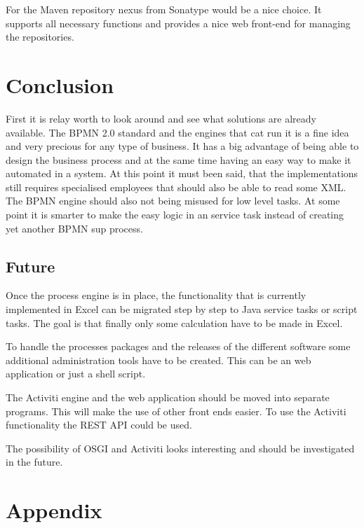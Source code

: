 \documentclass[paper=a4,twoside=false,BCOR=0mm,DIV=calc,fontsize=12pt]{scrartcl}
\begin{document}
For the Maven repository nexus from Sonatype would be a nice choice. It supports all necessary functions and provides a nice web front-end for managing the repositories.





\section{Conclusion}
First it is relay worth to look around and see what solutions are already available. The BPMN 2.0 standard and the engines that cat run it is a fine 
idea and very precious for any type of business. It has a big advantage of being able to design the business process and at the same time having an easy way to make it automated in a system.
At this point it must been said, that the implementations still requires specialised employees that should also be able to read some XML. The BPMN engine should also not being misused for low level tasks. At some point it is smarter to make the easy logic in an service task instead of creating yet another BPMN sup process.




\subsection{Future}
Once the process engine is in place, the functionality that is currently implemented in Excel can be migrated step by step to Java service tasks or script tasks. The goal is that finally only some calculation have to be made in Excel.

To handle the processes packages and the releases of the different software some additional administration tools have to be created. This can be an web application or just a shell script.

The Activiti engine and the web application should be moved into separate programs. This will make the use of other front ends easier. To use the Activiti functionality the REST API could be used.

The possibility of OSGI and Activiti \cite{osgiactivit} looks interesting and should be investigated in the future.


\newpage


\section{Appendix}
\end{document}
